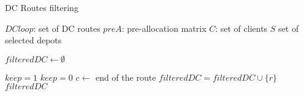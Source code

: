 \documentclass[10pt, a4paper]{article}
\begin{document}
\begin{algorithm}
	\caption{DC Routes filtering}
	\label{algo:DCfiltering}
	\begin{algorithmic}[1]
		\REQUIRE $DCloop$: set of DC routes
		\REQUIRE $preA$: pre-allocation matrix
		\REQUIRE $C$: set of clients
		\REQUIRE $S$ set of selected depots
		
		\STATE $filteredDC \leftarrow \emptyset$
				
			\STATE $keep = 1$
						\STATE $keep=0$
						\STATE $c \leftarrow $ end of the route
					\ENDIF
				\ENDFOR
			\ELSE 
			\ENDIF
				\STATE $filteredDC =filteredDC \cup \{r \}$
			\ENDIF
		\ENDFOR
		\RETURN $filtered DC$
	\end{algorithmic}
\end{algorithm}





\newpage



\end{document}
